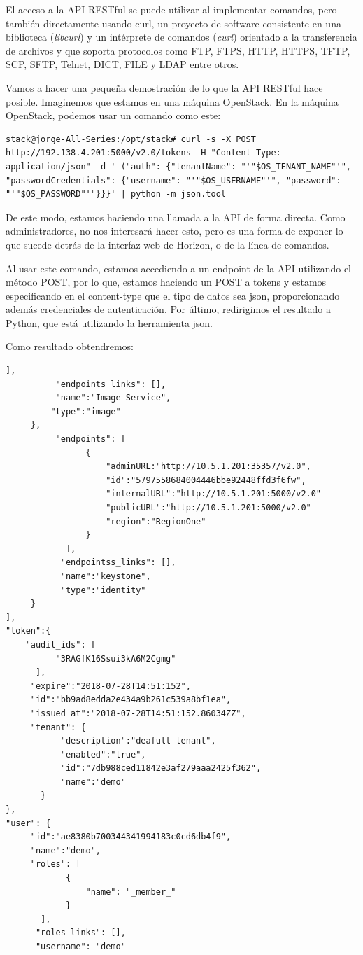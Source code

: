 El acceso a la API RESTful se puede utilizar al implementar comandos, pero también directamente usando curl, un proyecto de software consistente en una biblioteca (\textit{libcurl}) y un intérprete de comandos (\textit{curl}) orientado a la transferencia de archivos y que soporta protocolos como FTP, FTPS, HTTP, HTTPS, TFTP, SCP, SFTP, Telnet, DICT, FILE y LDAP entre otros.\cite{noauthor_curl_nodate}

Vamos a hacer una pequeña demostración de lo que la API RESTful hace posible.
Imaginemos que estamos en una máquina OpenStack. En la máquina OpenStack, podemos usar un comando como este:

\begin{lstlisting}[style=Consola]
stack@jorge-All-Series:/opt/stack# curl -s -X POST http://192.138.4.201:5000/v2.0/tokens -H "Content-Type: application/json" -d ' ("auth": {"tenantName": "'"$OS_TENANT_NAME"'", "passwordCredentials": {"username": "'"$OS_USERNAME"'", "password": "'"$OS_PASSWORD"'"}}}' | python -m json.tool
\end{lstlisting}

De este modo, estamos haciendo una llamada a la API de forma directa. Como administradores, no nos interesará hacer esto, pero es una forma de exponer lo que sucede detrás de la interfaz web de Horizon, o de la línea de comandos.

Al usar este comando, estamos accediendo a un endpoint de la API utilizando el método POST, por lo que, estamos haciendo un POST a tokens y estamos especificando en el content-type que el tipo de datos sea json, proporcionando además  credenciales de autenticación. Por último, redirigimos el resultado a Python, que está utilizando la herramienta json.

Como resultado obtendremos:

\begin{lstlisting}[style=Consola]
          ],
          "endpoints links": [],
          "name":"Image Service",
         "type":"image"
     },
          "endpoints": [
                {
                    "adminURL:"http://10.5.1.201:35357/v2.0",
                    "id":"5797558684004446bbe92448ffd3f6fw",
                    "internalURL":"http://10.5.1.201:5000/v2.0"
                    "publicURL":"http://10.5.1.201:5000/v2.0"
                    "region":"RegionOne"
                }
            ],
           "endpointss_links": [],
           "name":"keystone",
           "type":"identity"
     }
],
"token":{
    "audit_ids": [
          "3RAGfK16Ssui3kA6M2Cgmg"
      ],
     "expire":"2018-07-28T14:51:152",
     "id":"bb9ad8edda2e434a9b261c539a8bf1ea",
     "issued_at":"2018-07-28T14:51:152.86034ZZ",
     "tenant": {
           "description":"deafult tenant",
           "enabled":"true",
           "id":"7db988ced11842e3af279aaa2425f362",
           "name":"demo"
       }
},
"user": {
     "id":"ae8380b700344341994183c0cd6db4f9",
     "name":"demo",
     "roles": [
            {
                "name": "_member_"
            }
       ],	
      "roles_links": [],
      "username": "demo"
\end{lstlisting}

